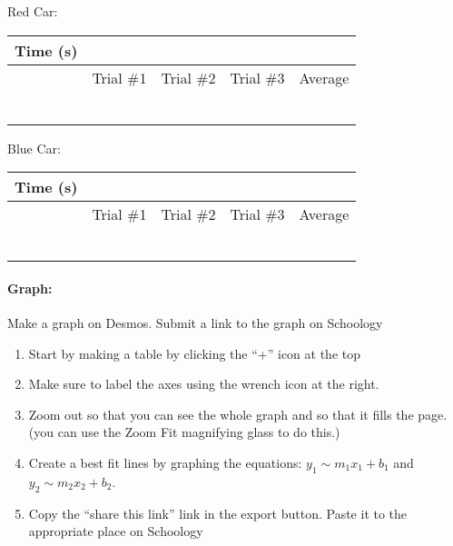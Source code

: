 \documentclass[10pt]{exam}
\begin{document}
  \def\cw{.15\textwidth}
  \def\ch{1em}

  \newcommand{\datatable}{
    \begin{center}
      \begin{tabular}
        {|*{5}{>{\centering\arraybackslash}m{\cw}|}}
        \hline
        \multirow{2}{\cw}
          {\centering Time (s)} & 
        \multicolumn{4}{c|}{Distance Traveled (m)} \\
        \cline{2-5}
        & Trial \#1 & Trial \#2 & Trial \#3 & Average \\
        \hline
        2 &&&&\\[\ch]
        \hline
        4 &&&&\\[\ch]
        \hline
        6 &&&&\\[\ch]
        \hline
        8 &&&&\\[\ch]
        \hline
        10 &&&&\\[\ch]
        \hline
        12 &&&&\\[\ch]
        \hline
      \end{tabular}
    \end{center}
  }

  Red Car:
  \datatable

  Blue Car:
  \datatable

  \paragraph{Graph:} 
    Make a graph on Desmos.  Submit a link to the graph on Schoology
    
    \begin{enumerate}[label=\alph*),topsep=0pt,itemsep=-1ex,partopsep=1ex,parsep=1ex]
      \item 
        Start by making a table by clicking the “+” icon at the top 
      \item
        Make sure to label the axes using the wrench icon at the right.
      \item
        Zoom out so that you can see the whole graph and so that it fills the page. (you can use the Zoom Fit magnifying glass to do this.)
      \item
        Create a best fit lines by graphing the equations: $y_1 \sim m_1 x_1 + b_1$ and $y_2 \sim m_2 x_2 + b_2$.
      \item
        Copy the “share this link” link in the export button.  Paste it to the appropriate place on Schoology
    \end{enumerate}
\end{document}
